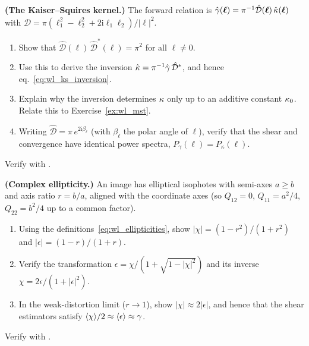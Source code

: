\begin{exercise}
\label{ex:wl_ks}
\textbf{(The Kaiser--Squires kernel.)}
The forward relation is
$\hat{\gamma}(\boldsymbol\ell) = \pi^{-1}\hat{\mathcal D}(\boldsymbol\ell)\,
\hat{\kappa}(\boldsymbol\ell)$ with $\hat{\mathcal D} =
\pi(\ell_1^2 - \ell_2^2 + 2\mathrm i\ell_1\ell_2)/|\boldsymbol\ell|^2$.
\begin{enumerate}[label=(\alph*)]
    \item Show that $\hat{\mathcal D}(\boldsymbol\ell)\,
          \hat{\mathcal D}^*(\boldsymbol\ell) = \pi^2$ for all
          $\boldsymbol\ell \neq 0$.
    \item Use this to derive the inversion
          $\hat{\kappa} = \pi^{-1}\hat{\gamma}\,\hat{\mathcal D}^*$, and
          hence eq.~\eqref{eq:wl_ks_inversion}.
    \item Explain why the inversion determines $\kappa$ only up to an
          additive constant $\kappa_0$.  Relate this to
          Exercise~\ref{ex:wl_mst}.
    \item Writing $\hat{\mathcal D} = \pi\, e^{2\mathrm i\beta_\ell}$
          (with $\beta_\ell$ the polar angle of $\boldsymbol\ell$), verify
          that the shear and convergence have identical power spectra,
          $P_\gamma(\ell) = P_\kappa(\ell)$.
\end{enumerate}
Verify with
.
\end{exercise}

\begin{exercise}
\label{ex:wl_ellipticity}
\textbf{(Complex ellipticity.)}
An image has elliptical isophotes with semi-axes $a \ge b$ and axis ratio
$r = b/a$, aligned with the coordinate axes (so $Q_{12} = 0$,
$Q_{11} = a^2/4$, $Q_{22} = b^2/4$ up to a common factor).
\begin{enumerate}[label=(\alph*)]
    \item Using the definitions~\eqref{eq:wl_ellipticities}, show
          $|\chi| = (1-r^2)/(1+r^2)$ and $|\epsilon| = (1-r)/(1+r)$.
    \item Verify the transformation
          $\epsilon = \chi/(1 + \sqrt{1-|\chi|^2})$ and its inverse
          $\chi = 2\epsilon/(1+|\epsilon|^2)$.
    \item In the weak-distortion limit ($r \to 1$), show
          $|\chi| \approx 2|\epsilon|$, and hence that the shear estimators
          satisfy $\langle\chi\rangle/2 \approx \langle\epsilon\rangle
          \approx \gamma$.
\end{enumerate}
Verify with
.
\end{exercise}

